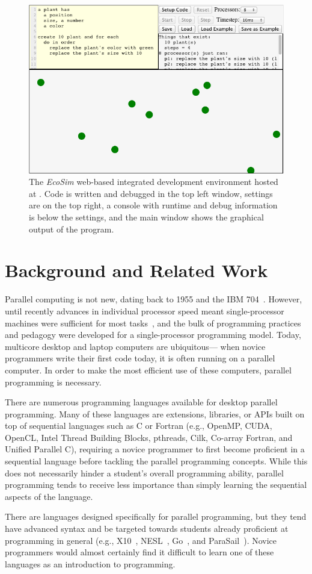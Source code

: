 \documentclass{sig-alternate}
\begin{document}
\begin{figure}
\centerline{\includegraphics[width=.49\textwidth]{figures/EcosimScreencap2.png}}
\caption{The \emph{EcoSim} web-based integrated development environment hosted at
\ecosimPath{}.  Code is written and debugged in the top left window, settings are on
the top right, a console with runtime and debug information is below the settings, and the
main window shows the graphical output of the program.}
\label{fig:ecosimScreencap}
\end{figure}


\section{Background and Related Work}
Parallel computing is not new, dating back to 1955 and the IBM 704~\cite{hockney1988parallel}.
However, until recently advances in individual processor speed meant single-processor machines
were sufficient for most tasks~\cite{amdahl1967validity}, 
and the bulk of programming practices and pedagogy were developed for a single-processor programming model.
Today, multicore desktop and laptop computers are ubiquitous---%
when novice programmers write their first code today, it is often running on a parallel computer.
In order to make the most efficient use of these computers, parallel programming is necessary.  


There are numerous programming languages available for desktop parallel programming.  Many of
these languages are extensions, libraries, or APIs built on top of sequential languages such 
as C or Fortran 
(e.g., OpenMP, CUDA, OpenCL, Intel Thread Building Blocks, pthreads, Cilk, Co-array Fortran, and Unified Parallel C),
requiring a novice programmer to first become proficient in a sequential language 
before tackling the parallel programming concepts.  
While this does not necessarily hinder a student's overall programming ability, 
parallel programming tends to receive less importance 
than simply learning the sequential aspects of the language.  

There are languages designed specifically for parallel programming, 
but they tend have advanced syntax 
and be targeted towards students already proficient at programming in general 
(e.g., X10~\cite{X10}, NESL~\cite{nesl-impl-94}, Go~\cite{GoLanguage}, and ParaSail~\cite{ParaSail}).  
Novice programmers would almost certainly find it difficult to learn one of these languages
as an introduction to programming.
\end{document}
